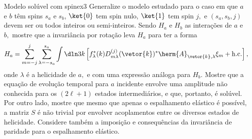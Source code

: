 \begin{exercício}{Modelo solúvel com spin}{ex3}
   Generalize o modelo estudado para o caso em que \(a\) e \(b\) têm spins \(s_a\) e \(s_b\), \(\ket{0}\) tem spin nulo, \(\ket{1}\) tem spin \(j,\) e \((s_a,s_b,j)\) devem ser ou todos inteiros ou semi-inteiros. Sendo \(H_a\) e \(H_b\) as interações de \(a\) e \(b,\) mostre que a invariância por rotação leva \(H_a\) para ter a forma
   \begin{equation*}
      H_a = \sum_{m = -j}^j \sum_{\lambda = -s_a}^{s_a} \int \dln3k \left[f_{\lambda}^*(k) D^{(j)}_{m \lambda}(\vetor{k})^* \herm{A}_{\vetor{k}, \lambda} \xi_m + \mathrm{h.c.}\right],
   \end{equation*}
   onde \(\lambda\) é a helicidade de \(a,\) e com uma expressão análoga para \(H_b\). Mostre que a equação de evolução temporal para \(a\) incidente envolve uma amplitude não conhecida para os \((2\ell + 1)\) estados intermediários, e que, portanto, é solúvel. Por outro lado, mostre que mesmo que apenas o espalhamento elástico é possível, a matriz \(S\) é não trivial por envolver acoplamentos entre os diversos estados de helicidade. Considere também a imposição e consequências da invariância de paridade para o espalhamento elástico.
\end{exercício}
